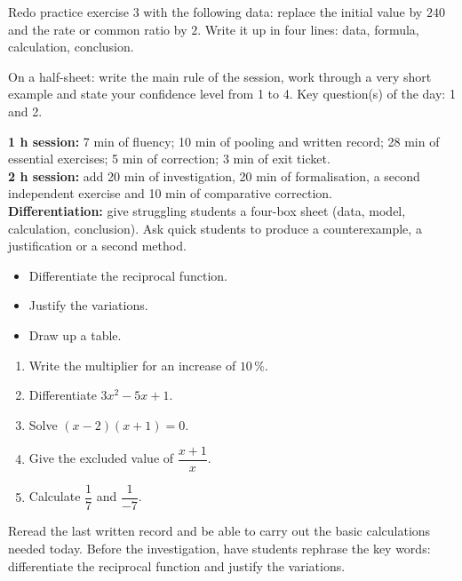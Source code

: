 
\begin{dm}Redo practice exercise 3 with the following data: replace the initial value by $240$ and the rate or common ratio by $2$. Write it up in four lines: data, formula, calculation, conclusion.\end{dm}

\begin{sortie}On a half-sheet: write the main rule of the session, work through a very short example and state your confidence level from 1 to 4. Key question(s) of the day: 1 and 2.\end{sortie}

\ifprof
\begin{methode}
\textbf{1 h session:} 7 min of fluency; 10 min of pooling and written record; 28 min of essential exercises; 5 min of correction; 3 min of exit ticket.\\
\textbf{2 h session:} add 20 min of investigation, 20 min of formalisation, a second independent exercise and 10 min of comparative correction.\\
\textbf{Differentiation:} give struggling students a four-box sheet (data, model, calculation, conclusion). Ask quick students to produce a counterexample, a justification or a second method.
\end{methode}
\fi
{}
\begin{objectifs}\begin{itemize}\item Differentiate the reciprocal function.\item Justify the variations.\item Draw up a table.\end{itemize}\end{objectifs}
\begin{automatismes}\begin{enumerate}\item Write the multiplier for an increase of $10\,\%$. \item Differentiate $3x^2-5x+1$. \item Solve $(x-2)(x+1)=0$. \item Give the excluded value of $\dfrac{x+1}{x}$. \item Calculate $\dfrac1{7}$ and $\dfrac1{-7}$. \end{enumerate}\end{automatismes}
\begin{prerequis}Reread the last written record and be able to carry out the basic calculations needed today. Before the investigation, have students rephrase the key words: differentiate the reciprocal function and justify the variations.\end{prerequis}

